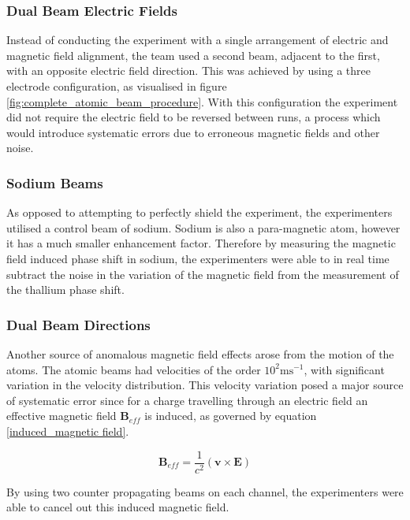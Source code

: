 \subsubsection{Dual Beam Electric Fields}

Instead of conducting the experiment with a single arrangement of electric and magnetic field alignment, the team used a second beam, adjacent to the first, with an opposite electric field direction. This was achieved by using a three electrode configuration, as visualised in figure \ref{fig:complete_atomic_beam_procedure}. With this configuration the experiment did not require the electric field to be reversed between runs, a process which would introduce systematic errors due to erroneous magnetic fields and other noise.

\subsubsection{Sodium Beams}

As opposed to attempting to perfectly shield the experiment, the experimenters utilised a control beam of sodium. Sodium is also a para-magnetic atom, however it has a much smaller enhancement factor. Therefore by measuring the magnetic field induced phase shift in sodium, the experimenters were able to in real time subtract the noise in the variation of the magnetic field from the measurement of the thallium phase shift.

\subsubsection{Dual Beam Directions}

Another source of anomalous magnetic field effects arose from the motion of the atoms. The atomic beams had velocities of the order $10^2$m$\text{s}^{-1}$, with significant variation in the velocity distribution. This velocity variation posed a major source of systematic error since for a charge travelling through an electric field an effective magnetic field $\mathbf{B}_{eff}$ is induced, as governed by equation \ref{induced_magnetic field}.

\begin{equation} \label{induced_magnetic field}
    \mathbf{B}_{eff} = \frac{1}{c^2}(\mathbf{v} \times \mathbf{E})
\end{equation}

By using two counter propagating beams on each channel, the experimenters were able to cancel out this induced magnetic field.

